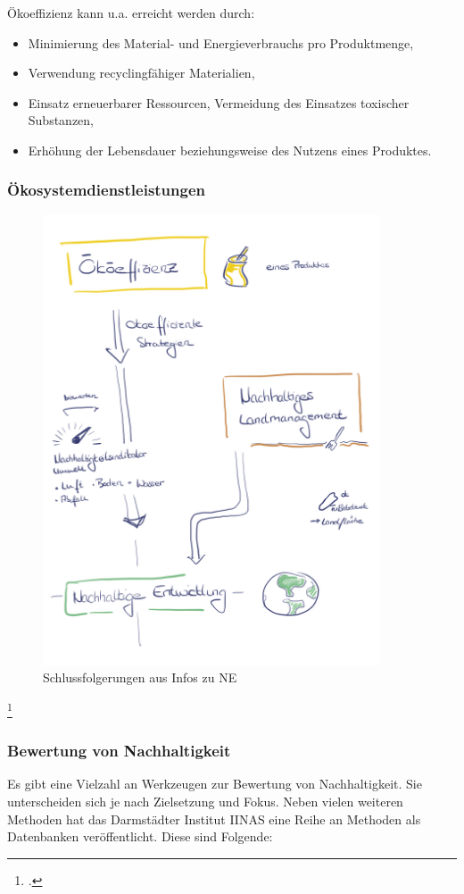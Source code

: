 \documentclass{scrartcl}
\begin{document}
Ökoeffizienz kann u.a. erreicht werden durch:
\begin{itemize}
\item Minimierung des Material- und Energieverbrauchs pro Produktmenge,
\item Verwendung recyclingfähiger Materialien,
\item Einsatz erneuerbarer Ressourcen, Vermeidung des Einsatzes toxischer Substanzen,
\item Erhöhung der Lebensdauer beziehungsweise des Nutzens eines Produktes.
\end{itemize}





\subsubsection{Ökosystemdienstleistungen}

\begin{figure}[htbp]
\centering
\includegraphics[width=10cm]{image_folder/NE_folgerungen.png}
\caption{Schlussfolgerungen aus Infos zu NE}
\label{fig:Folgerung_NE}
\end{figure}\footcite{Eigene Darstellung}

\subsubsection{Bewertung von Nachhaltigkeit}
Es gibt eine Vielzahl an Werkzeugen zur Bewertung von Nachhaltigkeit. Sie unterscheiden sich je nach Zielsetzung und Fokus. Neben vielen weiteren Methoden hat das Darmstädter Institut IINAS eine Reihe an Methoden als Datenbanken veröffentlicht. Diese sind Folgende:
\end{document}
